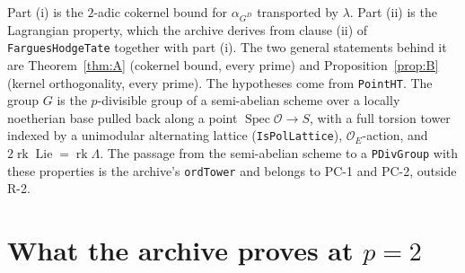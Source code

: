 \documentclass[11pt]{article}
\newcommand{\lean}[1]{\nolinkurl{#1}}
\theoremstyle{definition}
\theoremstyle{remark}
\newcommand{\cO}{\mathcal O}
\begin{document}
Part (i) is the $2$-adic cokernel bound for $\alpha_{G^D}$ transported by $\lambda$. Part (ii) is the Lagrangian property, which the archive derives from clause (ii) of \lean{FarguesHodgeTate} together with part (i). The two general statements behind it are Theorem~\ref{thm:A} (cokernel bound, every prime) and Proposition~\ref{prop:B} (kernel orthogonality, every prime). The hypotheses come from \lean{PointHT}. The group $G$ is the $p$-divisible group of a semi-abelian scheme over a locally noetherian base pulled back along a point $\operatorname{Spec}\cO\to S$, with a full torsion tower indexed by a unimodular alternating lattice (\lean{IsPolLattice}), $\cO_E$-action, and $2\operatorname{rk}\operatorname{Lie}=\operatorname{rk}\Lambda$. The passage from the semi-abelian scheme to a \lean{PDivGroup} with these properties is the archive's \lean{ordTower} and belongs to PC-1 and PC-2, outside R-2.

\section{What the archive proves at $p=2$}\label{sec:archive}
\end{document}
